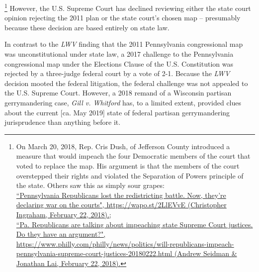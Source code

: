         \footnote{On March 20, 2018, Rep. Cris Dush, of Jefferson County introduced a measure that would impeach the four Democratic members of the court that voted to replace the map. His argument is that the members of the court overstepped their rights and violated the Separation of Powers principle of the state. Others saw this as simply sour grapes: \\ \href{https://wapo.st/2LlEVvE}{``Pennsylvania Republicans lost the redistricting battle. Now, they’re declaring war on the courts", https://wapo.st/2LlEVvE (Christopher Ingraham, February 22, 2018).;} \\ \href{https://www.philly.com/philly/news/politics/will-republicans-impeach-pennsylvania-supreme-court-justices-20180222.html}{``Pa. Republicans are talking about impeaching state Supreme Court justices. Do they have an argument?", https://www.philly.com/philly/news/politics/will-republicans-impeach-pennsylvania-supreme-court-justices-20180222.html (Andrew Seidman \& Jonathan Lai, February 22, 2018).}}
    However, the U.S. Supreme Court has declined reviewing either the state court opinion rejecting the 2011 plan or the state court’s chosen map -- presumably because these decision are based entirely on state law.
\par
    In contrast to the \textit{LWV} finding that the 2011 Pennsylvania congressional map was unconstitutional under state law, a 2017 challenge to the Pennsylvania congressional map under the Elections Clause of the U.S. Constitution was rejected by a three-judge federal court by a vote of 2-1. Because the \textit{LWV} decision mooted the federal litigation, the federal challenge was not appealed to the U.S. Supreme Court. However, a 2018 remand of a Wisconsin partisan gerrymandering case, \textit{Gill v. Whitford} has, to a limited extent, provided clues about the current [ca. May 2019] state of federal partisan gerrymandering jurisprudence than anything before it.
